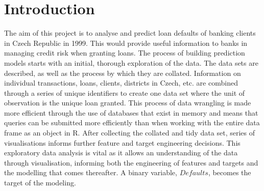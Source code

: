 \documentclass[11pt,preprint, authoryear]{elsarticle}
\numberwithin{equation}{section}
\numberwithin{figure}{section}
\numberwithin{table}{section}
\begin{document}
\pagestyle{fancy}
\chead{}
\rhead{}
\lfoot{}
\lhead{}
\cfoot{}


\headsep 35pt %




\hypertarget{introduction}{%
\section{\texorpdfstring{Introduction
\label{Introduction}}{Introduction }}\label{introduction}}

The aim of this project is to analyse and predict loan defaults of
banking clients in Czech Republic in 1999. This would provide useful
information to banks in managing credit risk when granting loans. The
process of building prediction models starts with an initial, thorough
exploration of the data. The data sets are described, as well as the
process by which they are collated. Information on individual
transactions, loans, clients, districts in Czech, etc. are combined
through a series of unique identifiers to create one data set where the
unit of observation is the unique loan granted. This process of data
wrangling is made more efficient through the use of databases that exist
in memory and means that queries can be submitted more efficiently than
when working with the entire data frame as an object in R. After
collecting the collated and tidy data set, series of visualisations
informs further feature and target engineering decisions. This
exploratory data analysis is vital as it allows an understanding of the
data through visualisation, informing both the engineering of features
and targets and the modelling that comes thereafter. A binary variable,
\(Defaults\), becomes the target of the modeling.
\end{document}
